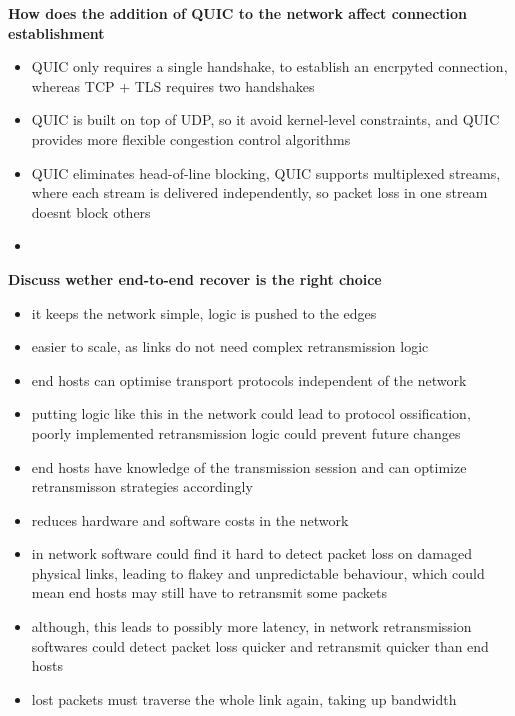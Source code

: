\documentclass{article}
\begin{document}
\textbf{How does the addition of QUIC to the network affect connection establishment}
\begin{itemize}
    \item QUIC only requires a single handshake, to establish an encrpyted connection, whereas TCP + TLS requires two handshakes
    \item QUIC is built on top of UDP, so it avoid kernel-level constraints, and QUIC provides more flexible congestion control algorithms
    \item QUIC eliminates head-of-line blocking, QUIC supports multiplexed streams, where each stream is delivered independently, so packet loss in one stream doesnt block others
    \item
\end{itemize}

\textbf{Discuss wether end-to-end recover is the right choice}
\begin{itemize}
    \item it keeps the network simple, logic is pushed to the edges
    \item easier to scale, as links do not need complex retransmission logic
    \item end hosts can optimise transport protocols independent of the network
    \item putting logic like this in the network could lead to protocol ossification, poorly implemented retransmission logic could prevent future changes
    \item end hosts have knowledge of the transmission session and can optimize retransmisson strategies accordingly
    \item reduces hardware and software costs in the network
    \item in network software could find it hard to detect packet loss on damaged physical links, leading to flakey and unpredictable behaviour, which could mean end hosts may still have to retransmit some packets
    \item although, this leads to possibly more latency, in network retransmission softwares could detect packet loss quicker and retransmit quicker than end hosts
    \item lost packets must traverse the whole link again, taking up bandwidth
\end{itemize}
\end{document}
